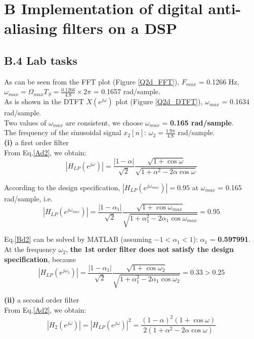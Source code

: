 \documentclass{article}
\newenvironment{homeworkProblem}[1]{
	\section*{#1}
	}{
}
\newenvironment{homeworkSection}[1]{
	\subsection*{#1}
	}{
}
\begin{document}
\begin{homeworkProblem}{B Implementation of digital anti-aliasing filters on a DSP}
\begin{homeworkSection}{B.4 Lab tasks}
As can be seen from the FFT plot (Figure \ref{Q2d_FFT}), $F_{max}$ = 0.1266 Hz, $\omega_{max} =\Omega_{max}T_{S}=\frac{0.1266}{4.8} \times 2\pi$ = 0.1657 rad/sample.\\
As is shown in the DTFT $X(e^{j\omega})$ plot (Figure \ref{Q2d_DTFT}), $\omega_{max}$ = 0.1634 rad/sample.\\

Two values of $\omega_{max}$ are consistent, we choose $\omega_{max}$ = \textbf{0.165 rad/sample}.\\

The frequency of the sinusoidal signal $x_2[n]$: $\omega_2 = \frac{1.9\pi}{4.8}$ rad/sample.\\

\textbf{(i)} a first order filter\\

From Eq.\ref{Ad2}, we obtain:
\begin{equation}\label{Bd1}
|H_{LP}(e^{j\omega})| = \frac{|1-\alpha|}{\sqrt{2}} \frac{\sqrt{1+\cos\omega}}{\sqrt{1+\alpha^2-2\alpha\cos\omega}}
\end{equation}

According to the design specification, $|H_{LP}(e^{j\omega_{max}})| = 0.95$ at $\omega_{max}$ = 0.165 rad/sample, i.e.
\begin{equation}\label{Bd2}
|H_{LP}(e^{j\omega_{max}})| = \frac{|1-\alpha_1|}{\sqrt{2}} \frac{\sqrt{1+\cos\omega_{max}}}{\sqrt{1+\alpha_1^2-2\alpha_1\cos\omega_{max}}} = 0.95
\end{equation}

Eq.\ref{Bd2} can be solved by MATLAB (assuming $-1 < \alpha_1 < 1$): $\alpha_1$ = \textbf{0.597991}.\\

At the frequency $\omega_2$, \textbf{the 1st order filter does not satisfy the design specification}, because
\begin{equation}\label{Bd3}
|H_{LP}(e^{j\omega_2})| = \frac{|1-\alpha_1|}{\sqrt{2}} \frac{\sqrt{1+\cos\omega_2}}{\sqrt{1+\alpha_1^2-2\alpha_1\cos\omega_2}} = 0.33 > 0.25
\end{equation}


\textbf{(ii)} a second order filter\\

From Eq.\ref{Ad2}, we obtain:
\begin{equation}\label{Bd4}
|H_2(e^{j\omega})| = |H_{LP}(e^{j\omega})|^2=\frac{(1-\alpha)^2(1+\cos\omega)}{2(1+\alpha^2-2\alpha\cos\omega)}
\end{equation}


\end{homeworkSection}
\end{homeworkProblem}
\end{document}
